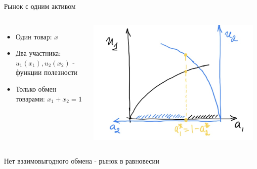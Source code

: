 \documentclass{beamer}
\begin{document}
\begin{frame}{Рынок с одним активом}
\begin{columns}
\begin{itemize}
    \item Один товар: $x$
    \item Два участника: $u_1(x_1), u_2(x_2)$ - функции полезности 
    \item Только обмен товарами: $x_1 + x_2 = 1$
\end{itemize}


        \includegraphics[width=1.0\textwidth]{2_figs/1asset.jpeg}


\end{columns}


Нет взаимовыгодного обмена - рынок в равновесии
\end{frame}
\end{document}
